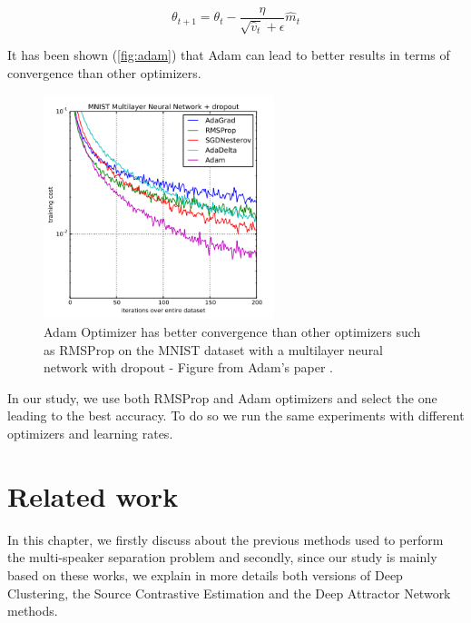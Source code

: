 \documentclass[master, tikz, final,11pt, dvipdfmx]{iscs-thesis}
\begin{document}
\[\theta_{t+1} = \theta_t - \frac{\eta}{\sqrt{ \hat v_t}+\epsilon} \hat m_t\]

It has been shown (\autoref{fig:adam}) that Adam can lead to better results in terms of convergence than other optimizers.

\begin{figure}[h]
\centering
\includegraphics[width=0.6\textwidth]{adam}
\caption[Comparison of SGD, Adam and RMSProp performances]{ Adam Optimizer has better convergence than other optimizers such as RMSProp on the MNIST dataset with a multilayer neural network with dropout - Figure from Adam's paper \cite{ADAM}.}
\label{fig:adam} 
\end{figure}

In our study, we use both RMSProp and Adam optimizers and select the one leading to the best accuracy. To do so we run the same experiments with different optimizers and learning rates.

\chapter{Related work}

In this chapter, we firstly discuss about the previous methods used to perform the multi-speaker separation problem and secondly, since our study is mainly based on these works, we explain in more details both versions of Deep Clustering, the Source Contrastive Estimation and the Deep Attractor Network methods.
\end{document}
